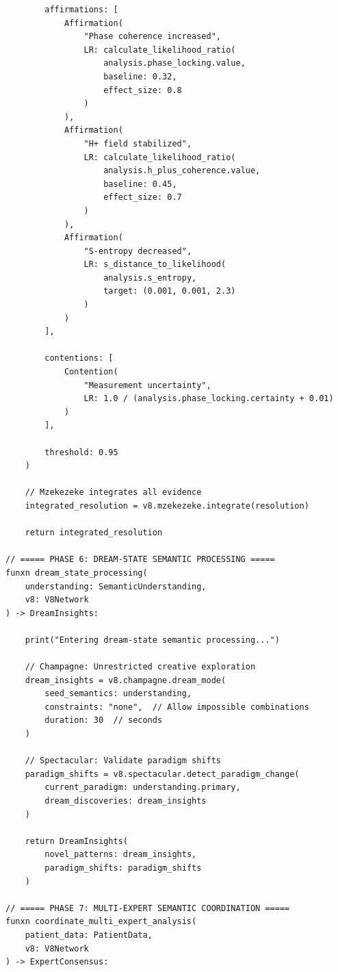 \begin{verbatim}
        affirmations: [
            Affirmation(
                "Phase coherence increased",
                LR: calculate_likelihood_ratio(
                    analysis.phase_locking.value,
                    baseline: 0.32,
                    effect_size: 0.8
                )
            ),
            Affirmation(
                "H+ field stabilized",
                LR: calculate_likelihood_ratio(
                    analysis.h_plus_coherence.value,
                    baseline: 0.45,
                    effect_size: 0.7
                )
            ),
            Affirmation(
                "S-entropy decreased",
                LR: s_distance_to_likelihood(
                    analysis.s_entropy,
                    target: (0.001, 0.001, 2.3)
                )
            )
        ],
        
        contentions: [
            Contention(
                "Measurement uncertainty",
                LR: 1.0 / (analysis.phase_locking.certainty + 0.01)
            )
        ],
        
        threshold: 0.95
    )
    
    // Mzekezeke integrates all evidence
    integrated_resolution = v8.mzekezeke.integrate(resolution)
    
    return integrated_resolution

// ===== PHASE 6: DREAM-STATE SEMANTIC PROCESSING =====
funxn dream_state_processing(
    understanding: SemanticUnderstanding,
    v8: V8Network
) -> DreamInsights:
    
    print("Entering dream-state semantic processing...")
    
    // Champagne: Unrestricted creative exploration
    dream_insights = v8.champagne.dream_mode(
        seed_semantics: understanding,
        constraints: "none",  // Allow impossible combinations
        duration: 30  // seconds
    )
    
    // Spectacular: Validate paradigm shifts
    paradigm_shifts = v8.spectacular.detect_paradigm_change(
        current_paradigm: understanding.primary,
        dream_discoveries: dream_insights
    )
    
    return DreamInsights(
        novel_patterns: dream_insights,
        paradigm_shifts: paradigm_shifts
    )

// ===== PHASE 7: MULTI-EXPERT SEMANTIC COORDINATION =====
funxn coordinate_multi_expert_analysis(
    patient_data: PatientData,
    v8: V8Network
) -> ExpertConsensus:
    

\end{verbatim}
